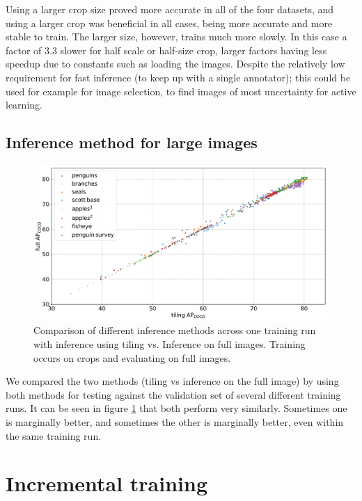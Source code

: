 \documentclass[conference]{IEEEtran}
\begin{document}
Using a larger crop size proved more accurate in all of the four datasets, and using a larger crop was beneficial in all cases, being more accurate and more stable to train. The larger size, however, trains much more slowly. In this case a factor of $3.3$ slower for half scale or half-size crop, larger factors having less speedup due to constants such as loading the images. Despite the relatively low requirement for fast inference (to keep up with a single annotator); this could be used for example for image selection, to find images of most uncertainty for active learning.

\subsection {Inference method for large images}

\begin{figure}[htb] 
  \centering
  \includegraphics[width=1.0\linewidth]{figures/splits_scatters.pdf}
  \caption{Comparison of different inference methods across one training run with inference using tiling vs. Inference on full images. Training occurs on crops and evaluating on full images. }   
  \label{fig:inference_method}
\end{figure}


We compared the two methods (tiling vs inference on the full image) by using both methods for testing against the validation set of several different training runs. It can be seen in figure \ref{fig:inference_method} that both perform very similarly. Sometimes one is marginally better, and sometimes the other is marginally better, even within the same training run.



\section {Incremental training}
\end{document}
